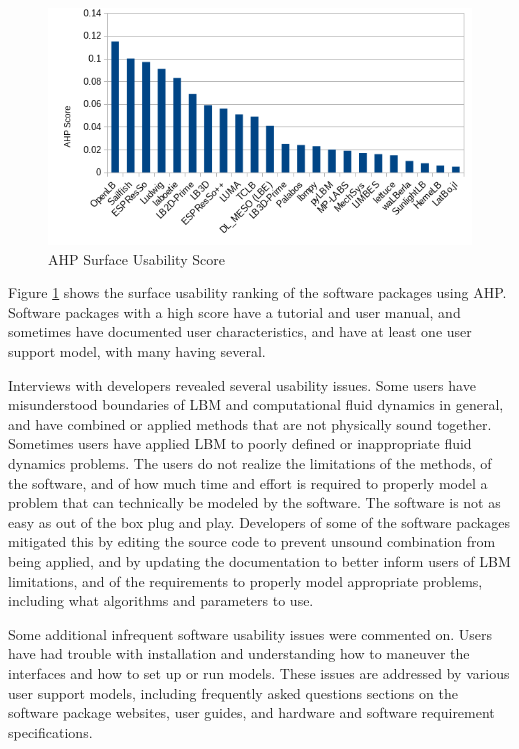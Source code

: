 \documentclass[12pt, notitlepage]{article}
\begin{document}
\begin{figure}[h!]
	\begin{center}
		\includegraphics[width=1.0\textwidth]{usability_chart}
		\caption{AHP Surface Usability Score}
		\label{Fig_Usability}
	\end{center}
\end{figure}

Figure \ref{Fig_Usability} shows the surface usability ranking of the software packages using AHP. Software packages with a high score have a tutorial and user manual, and sometimes have documented user characteristics, and have at least one user support model, with many having several. 

Interviews with developers revealed several usability issues. Some users have misunderstood boundaries of LBM and computational fluid dynamics in general, and have combined or applied methods that are not physically sound together. Sometimes users have applied LBM to poorly defined or inappropriate fluid dynamics problems. The users do not realize the limitations of the methods, of the software, and of how much time and effort is required to properly model a problem that can technically be modeled by the software. The software is not as easy as out of the box plug and play. Developers of some of the software packages mitigated this by editing the source code to prevent unsound combination from being applied, and by updating the documentation to better inform users of LBM limitations, and of the requirements to properly model appropriate problems, including what algorithms and parameters to use. 

Some additional infrequent software usability issues were commented on. Users have had trouble with installation and understanding how to maneuver the interfaces and how to set up or run models. These issues are addressed by various user support models, including frequently asked questions sections on the software package websites, user guides, and hardware and software requirement specifications.
\end{document}
